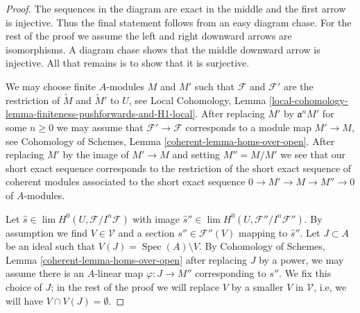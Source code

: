 \documentclass{stacks-project}
\theoremstyle{plain}
\theoremstyle{definition}
\theoremstyle{remark}
\numberwithin{equation}{subsection}
\def\lim{\mathop{\mathrm{lim}}\nolimits}
\def\Spec{\mathop{\mathrm{Spec}}}
\begin{document}
\begin{proof}
The sequences in the diagram are exact in the middle and the first
arrow is injective. Thus the final statement follows from an easy
diagram chase. For the rest of the proof we assume the left and
right downward arrows are isomorphisms. A diagram chase shows
that the middle downward arrow is injective. All that remains
is to show that it is surjective.

\medskip\noindent
We may choose finite $A$-modules $M$ and $M'$ such that $\mathcal{F}$
and $\mathcal{F}'$ are the restriction
of $\widetilde{M}$ and $\widetilde{M}'$ to $U$, see Local Cohomology, Lemma
\ref{local-cohomology-lemma-finiteness-pushforwards-and-H1-local}.
After replacing $M'$ by $\mathfrak a^n M'$ for some $n \geq 0$
we may assume that $\mathcal{F}' \to \mathcal{F}$
corresponds to a module map $M' \to M$, see
Cohomology of Schemes, Lemma \ref{coherent-lemma-homs-over-open}.
After replacing $M'$ by the image of $M' \to M$
and setting $M'' = M/M'$ we see that our short exact sequence
corresponds to the restriction of the short exact sequence of
coherent modules associated to the short exact sequence
$0 \to M' \to M \to M'' \to 0$ of $A$-modules.

\medskip\noindent
Let $\hat s \in \lim H^0(U, \mathcal{F}/I^n\mathcal{F})$
with image $\hat s'' \in \lim H^0(U, \mathcal{F}''/I^n\mathcal{F}'')$.
By assumption we find $V \in \mathcal{V}$
and a section $s'' \in \mathcal{F}''(V)$ mapping to $\hat s''$.
Let $J \subset A$ be an ideal such that $V(J) = \Spec(A) \setminus V$.
By Cohomology of Schemes, Lemma \ref{coherent-lemma-homs-over-open}
after replacing $J$ by a power, we may assume
there is an $A$-linear map $\varphi : J \to M''$
corresponding to $s''$. We fix this choice of $J$; in the rest
of the proof we will replace $V$ by a smaller $V$ in $\mathcal{V}$,
i.e, we will have $V \cap V(J) = \emptyset$.


\end{proof}
\end{document}
